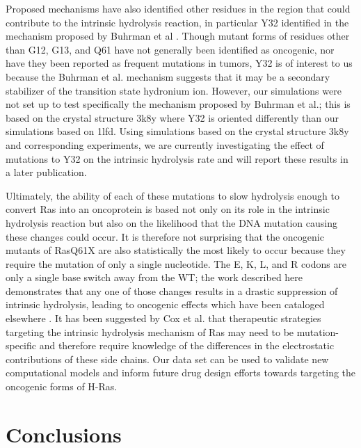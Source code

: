 Proposed mechanisms have also identified other residues in the region that could contribute to the intrinsic hydrolysis reaction, in particular Y32 identified in the mechanism proposed by Buhrman et al \cite{Buhrman2010}. 
Though mutant forms of residues other than G12, G13, and Q61 have not generally been identified as oncogenic, nor have they been reported as frequent mutations in tumors, Y32 is of interest to us because the Buhrman et al. mechanism suggests that it may be a secondary stabilizer of the transition state hydronium ion. 
However, our simulations were not set up to test specifically the mechanism proposed by Buhrman et al.; this is based on the crystal structure 3k8y where Y32 is oriented differently than our simulations based on 1lfd. 
Using simulations based on the crystal structure 3k8y and corresponding experiments, we are currently investigating the effect of mutations to Y32 on the intrinsic hydrolysis rate and will report these results in a later publication. 

Ultimately, the ability of each of these mutations to slow hydrolysis enough to convert Ras into an oncoprotein is based not only on its role in the intrinsic hydrolysis reaction but also on the likelihood that the DNA mutation causing these changes could occur. 
It is therefore not surprising that the oncogenic mutants of RasQ61X are also statistically the most likely to occur because they require the mutation of only a single nucleotide. 
The E, K, L, and R codons are only a single base switch away from the WT; the work described here demonstrates that any one of those changes results in a drastic suppression of intrinsic hydrolysis, leading to oncogenic effects which have been cataloged elsewhere \cite{Prior2012, Hobbs2016}. 
It has been suggested by Cox et al. that therapeutic strategies targeting the intrinsic hydrolysis mechanism of Ras may need to be mutation-specific\cite{Cox2014} and therefore require knowledge of the differences in the electrostatic contributions of these side chains. 
Our data set can be used to validate new computational models and inform future drug design efforts towards targeting the oncogenic forms of H-Ras. 

\section{Conclusions}\label{pKa-conclusion}

